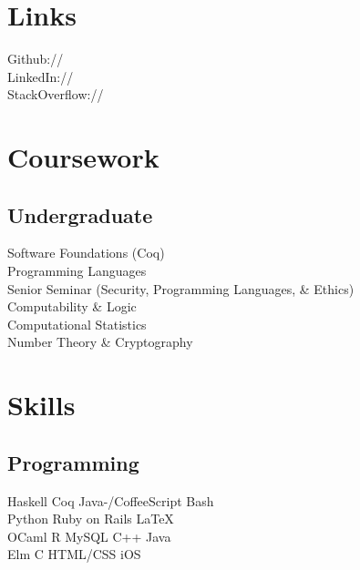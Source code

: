 \documentclass[]{deedy-resume-openfont}
\begin{document}
\begin{minipage}[t]{0.33\textwidth}
\section{Links} 
Github:// \href{https://github.com/ericthewry}{} \\
LinkedIn://  \href{https://www.linkedin.com/in/eric-campbell-ba339490/}{} \\
StackOverflow:// \href{https://stackoverflow.com/users/8202530/ericthewry}{}
\sectionsep


\section{Coursework}

\subsection{Undergraduate}
Software Foundations (Coq) \\
Programming Languages \\
Senior Seminar (Security, Programming Languages, \& Ethics) \\
Computability \& Logic \\
Computational Statistics \\
Number Theory \& Cryptography
\sectionsep


\section{Skills}
\subsection{Programming}
Haskell \textbullet{} Coq \textbullet{} Java-/CoffeeScript \textbullet{}Bash  \\
Python \textbullet{} Ruby on Rails \textbullet{} \LaTeX\ \\ 
OCaml \textbullet{} R \textbullet{} MySQL \textbullet{} C++ \textbullet{} Java \\
Elm \textbullet{} C  \textbullet{} HTML/CSS  \textbullet{} iOS
\sectionsep


\end{minipage}
\end{document}
